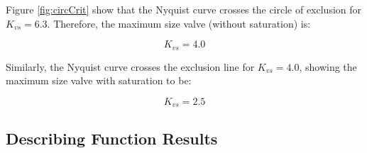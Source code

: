 \documentclass[a4paper, titlepage]{article}
\begin{document}
%
%
%
%
%
%

Figure \ref{fig:circCrit} show that the Nyquist curve crosses the circle of exclusion for $K_{vs}=6.3$.  Therefore, the maximum size valve (without saturation) is:

\begin{equation}
K_{vs} = 4.0
\label{equ:k_max_wo_saturation}
\end{equation}

Similarly, the Nyquist curve crosses the exclusion line for $K_{vs}=4.0$, showing the maximum size valve with saturation to be:

\begin{equation}
K_{vs} = 2.5
\label{equ:k_max_w_saturation}
\end{equation}

\subsection{Describing Function Results}
\end{document}
